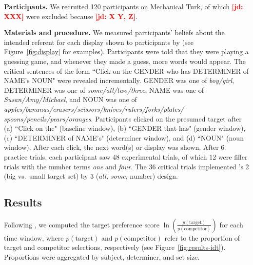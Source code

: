 \documentclass[10pt,letterpaper]{article}
\newcommand{\figref}[1]{Figure~\ref{#1}}
\newcommand{\jd}[1]{\textcolor{Red}{\textbf{[jd: #1]}}}
\begin{document}
\textbf{Participants.} We recruited 120 participants on Mechanical Turk, of which \jd{XXX} were excluded because \jd{X Y, Z}. 

\textbf{Materials and procedure.} We measured participants' beliefs about the intended referent for each display shown to participants by  (see \figref{fig:display} for examples). Participants were told that they were playing a guessing game, and whenever they made a guess, more words would appear. The critical sentences of the form ``Click on the GENDER who has DETERMINER  of NAME's NOUN" were revealed incrementally. GENDER was one of \emph{boy/girl}, DETERMINER was one of \emph{some/all/two/three}, NAME was one of \emph{Susan/Amy/Michael}, and NOUN was one of \emph{apples/bananas/erasers/scissors/knives/rulers/forks/plates/
spoons/pencils/pears/oranges}.  Participants clicked on the presumed target after (a) ``Click on the" (baseline window), (b) ``GENDER that has" (gender window), (c) ``DETERMINER of NAME's" (determiner window), and (d) ``NOUN" (noun window). After each click, the next word(s) or display was shown. After 6 practice trials, each participant saw 48 experimental trials, of which 12 were filler trials with the number terms \emph{one} and \emph{four}. The 36 critical trials implemented 's 2 (big vs.~small target set) by 3 (\emph{all, some}, number) design. 


\subsection{Results}

Following , we computed the target preference score $\ln (\frac{p(\text{target})}{p(\text{competitor})})$ for each time window, where  $p(\text{target})$ and $p(\text{competitor})$ refer to the proportion of target and competitor selections, respectively (see \figref{fig:results-idt}). Proportions were aggregated by subject, determiner, and set size. 
\end{document}
